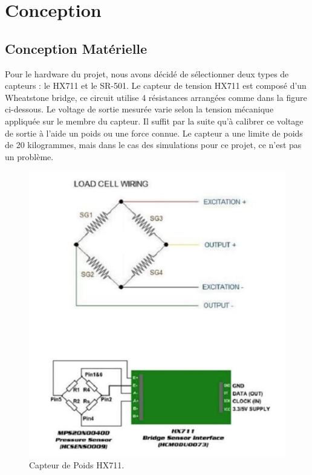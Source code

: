 \documentclass[journal]{IEEEtran}
\begin{document}
\section{Conception}

\subsection{Conception Matérielle}

Pour le hardware du projet, nous avons décidé de sélectionner deux types de capteurs : le HX711 et le SR-501. Le capteur de tension HX711 est composé d’un Wheatstone bridge, ce circuit utilise 4 résistances arrangées comme dans la figure ci-dessous.
Le voltage de sortie mesurée varie selon la tension mécanique appliquée sur le membre du capteur. Il suffit par la suite qu’à calibrer ce voltage de sortie à l’aide un poids ou une force connue. 
Le capteur a une limite de poids de 20 kilogrammes, mais dans le cas des simulations pour ce projet, ce n’est pas un problème. 

\begin{figure}[htbp]
    \centerline{\includegraphics{hardware1.png}}
    \caption{Capteur de Poids HX711.\cite{b3}}
    \label{fig1}
\end{figure} 
\end{document}
